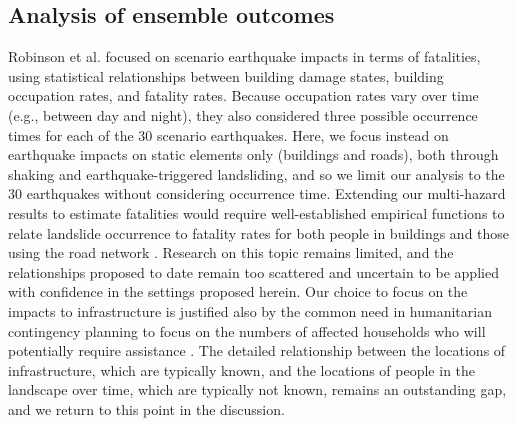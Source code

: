 \documentclass[preprint,12pt,authoryear]{elsarticle}
\begin{document}
\subsection{Analysis of ensemble outcomes}

Robinson et al. \citep{Robinson2018} focused on scenario earthquake impacts in terms of fatalities, using statistical relationships between building damage states, building occupation rates, and fatality rates. Because occupation rates vary over time (e.g., between day and night), they also considered three possible occurrence times for each of the 30 scenario earthquakes. Here, we focus instead on earthquake impacts on static elements only (buildings and roads), both through shaking and earthquake-triggered landsliding, and so we limit our analysis to the 30 earthquakes without considering occurrence time. Extending our multi-hazard results to estimate fatalities would require well-established empirical functions to relate landslide occurrence to fatality rates for both people in buildings and those using the road network \citep{VanWykDeVries2024}. Research on this topic remains limited, and the relationships proposed to date \citep{Pollock2020,Luo2023,Hu2024} remain too scattered and uncertain to be applied with confidence in the settings proposed herein. Our choice to focus on the impacts to infrastructure is justified also by the common need in humanitarian contingency planning to focus on the numbers of affected households who will potentially require assistance \citep{IASC2007, sijapati2025}. The detailed relationship between the locations of infrastructure, which are typically known, and the locations of people in the landscape over time, which are typically not known, remains an outstanding gap, and we return to this point in the discussion.
\end{document}
